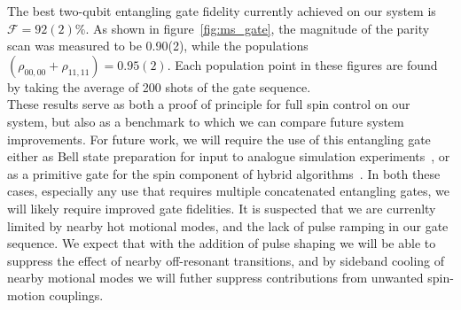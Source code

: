     The best two-qubit entangling gate fidelity currently achieved on our system is $\mathcal{F}=92(2)\%$. As shown in figure~\ref{fig:ms_gate}, the magnitude of the parity scan was measured to be 0.90(2), while the populations $\left( \rho_{00,00} + \rho_{11,11} \right) = 0.95(2)$. Each population point in these figures are found by taking the average of 200 shots of the gate sequence.\\

    These results serve as both a proof of principle for full spin control on
    our system, but also as a benchmark to which we can compare future system
    improvements.  For future work, we will require the use of this entangling
    gate either as Bell state preparation for input to analogue simulation
    experiments~\cite{}, or as a primitive gate for the spin component of hybrid
    algorithms~\cite{}.  In both these cases, especially any use that requires
    multiple concatenated entangling gates, we will likely require improved gate
    fidelities. It is suspected that we are currenlty limited by nearby hot
    motional modes, and the lack of pulse ramping in our gate sequence. We
    expect that with the addition of pulse shaping we will be able to suppress
    the effect of nearby off-resonant transitions, and by sideband cooling of
    nearby motional modes we will futher suppress contributions from unwanted
    spin-motion couplings.\\
